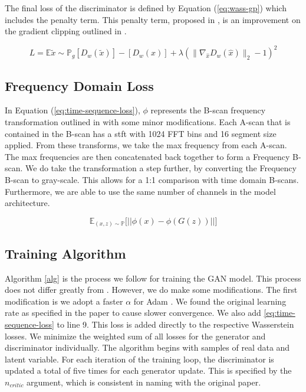 \hspace{0.5in}The final loss of the discriminator is defined by Equation (\ref{eq:wass-gp}) which includes the penalty term. This penalty term, proposed in \cite{WGAN-GP}, is an improvement on the gradient clipping outlined in \cite{WGAN}.

\begin{equation}
\label{eq:wass-gp}
    L = \mathbb{E} {\tilde{x} \sim \mathbb{P}_g} [D_{w}(\tilde{x})] - [D_{w}(x)] + \lambda(\|{\nabla_{\hat{x}} D_{w}(\hat{x})}\|_{2} - 1)^2
\end{equation}



\subsection{Frequency Domain Loss}
\hspace{0.5in}In Equation (\ref{eq:time-sequence-loss}), $\phi$ represents the B-scan frequency transformation outlined in \cite{ZHANG-2017} with some minor modifications. Each A-scan that is contained in the B-scan has a \acrfull{stft} \cite{stft} with 1024 FFT bins and 16 segment size applied. From these transforms, we take the max frequency from each A-scan. The max frequencies are then concatenated back together to form a Frequency B-scan. We do take the transformation a step further, by converting the Frequency B-scan to gray-scale. This allows for a 1:1 comparison with time domain B-scans. Furthermore, we are able to use the same number of channels in the model architecture.

\begin{equation}
\label{eq:time-sequence-loss}
    \mathbb{E}_{(x, z) \sim \mathbb{P}}\Big[ \big|\big| \phi(x) - \phi(G(z)) \big|\big| \Big]
\end{equation}

\subsection{Training Algorithm}
\hspace{0.5in}Algorithm \ref{alg} is the process we follow for training the GAN model. This process does not differ greatly from \cite{WGAN-GP}. However, we do make some modifications. The first modification is we adopt a faster $\alpha$ for Adam \cite{ADAM}. We found the original learning rate as specified in the paper to cause slower convergence. We also add \ref{eq:time-sequence-loss} to line 9. This loss is added directly to the respective Wasserstein losses. We minimize the weighted sum of all losses for the generator and discriminator individually. The algorithm begins with samples of real data and latent variable. For each iteration of the training loop, the discriminator is updated a total of five times for each generator update. This is specified by the $n_{critic}$ argument, which is consistent in naming with the original paper. 


